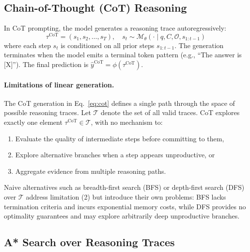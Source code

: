 \documentclass[11pt]{article}
\begin{document}
\subsection{Chain-of-Thought (CoT) Reasoning}

In CoT prompting, the model generates a reasoning trace autoregressively:
\begin{equation}
\tau^{\text{CoT}} = (s_1, s_2, \ldots, s_T), \quad s_t \sim \mathcal{M}_\theta(\cdot \mid q, C, \mathcal{O}, s_{1:t-1})
\label{eq:cot}
\end{equation}
where each step $s_t$ is conditioned on all prior steps $s_{1:t-1}$. The generation terminates when the model emits a terminal token pattern (e.g., ``The answer is [X]''). The final prediction is $\hat{y}^{\text{CoT}} = \phi(\tau^{\text{CoT}})$.

\paragraph{Limitations of linear generation.} The CoT generation in Eq.~\eqref{eq:cot} defines a single path through the space of possible reasoning traces. Let $\mathcal{T}$ denote the set of all valid traces. CoT explores exactly one element $\tau^{\text{CoT}} \in \mathcal{T}$, with no mechanism to:
\begin{enumerate}[nosep]
    \item Evaluate the quality of intermediate steps before committing to them,
    \item Explore alternative branches when a step appears unproductive, or
    \item Aggregate evidence from multiple reasoning paths.
\end{enumerate}
Naive alternatives such as breadth-first search (BFS) or depth-first search (DFS) over $\mathcal{T}$ address limitation (2) but introduce their own problems: BFS lacks termination criteria and incurs exponential memory costs, while DFS provides no optimality guarantees and may explore arbitrarily deep unproductive branches.

\subsection{A* Search over Reasoning Traces}
\end{document}
